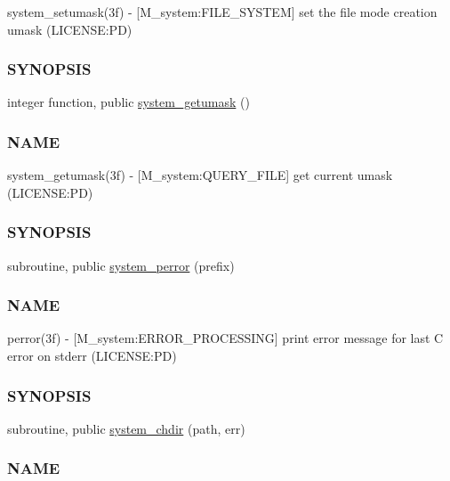 \begin{DoxyCompactItemize}
\begin{DoxyCompactList}
system\+\_\+setumask(3f) -\/ \mbox{[}M\+\_\+system\+:F\+I\+L\+E\+\_\+\+S\+Y\+S\+T\+EM\mbox{]} set the file mode creation umask (L\+I\+C\+E\+N\+SE\+:PD) \subsubsection*{S\+Y\+N\+O\+P\+S\+IS}\end{DoxyCompactList}\item 
integer function, public \mbox{\hyperlink{namespacem__system_aa9ca951be39d2ea738d627cf42c00ddd}{system\+\_\+getumask}} ()
\begin{DoxyCompactList}\small\item\em \subsubsection*{N\+A\+ME}

system\+\_\+getumask(3f) -\/ \mbox{[}M\+\_\+system\+:Q\+U\+E\+R\+Y\+\_\+\+F\+I\+LE\mbox{]} get current umask (L\+I\+C\+E\+N\+SE\+:PD) \subsubsection*{S\+Y\+N\+O\+P\+S\+IS}\end{DoxyCompactList}\item 
subroutine, public \mbox{\hyperlink{namespacem__system_afae451a1fc5432274dc1f75a364051b4}{system\+\_\+perror}} (prefix)
\begin{DoxyCompactList}\small\item\em \subsubsection*{N\+A\+ME}

perror(3f) -\/ \mbox{[}M\+\_\+system\+:E\+R\+R\+O\+R\+\_\+\+P\+R\+O\+C\+E\+S\+S\+I\+NG\mbox{]} print error message for last C error on stderr (L\+I\+C\+E\+N\+SE\+:PD) \subsubsection*{S\+Y\+N\+O\+P\+S\+IS}\end{DoxyCompactList}\item 
subroutine, public \mbox{\hyperlink{namespacem__system_a47746b670cb21bae0957c9bb2bccf209}{system\+\_\+chdir}} (path, err)
\begin{DoxyCompactList}\small\item\em \subsubsection*{N\+A\+ME}


\end{DoxyCompactList}
\end{DoxyCompactItemize}
